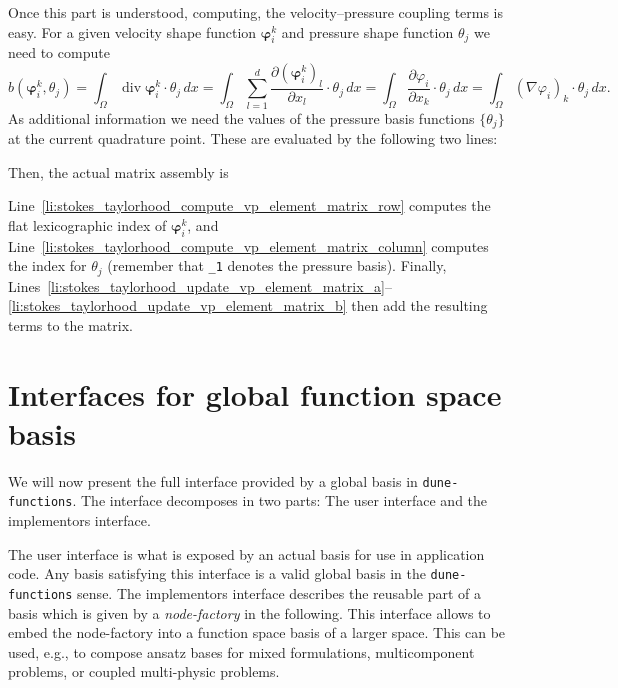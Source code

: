 \documentclass[a4paper,10pt,headings=normal,bibliography=totoc]{scrartcl}
\newcommand{\cpp}[1]{\lstinline[basicstyle=\ttfamily]!#1!}
\newcommand{\dunemodule}[1]{\texttt{#1}}
\begin{document}
Once this part is understood, computing, the velocity--pressure coupling terms is easy.
For a given velocity shape function $\bm{\varphi}_i^k$ and pressure shape function $\theta_j$ we need
to compute
\begin{equation*}
 b(\bm{\varphi}_i^k,\theta_j)
 =
 \int_\Omega \operatorname{div} \bm{\varphi}_i^k \cdot \theta_j\,dx
 =
 \int_\Omega \sum_{l=1}^d \frac{\partial (\bm{\varphi}_i^k)_l}{\partial x_l} \cdot \theta_j\,dx
 =
 \int_\Omega \frac{\partial \varphi_i}{\partial x_k} \cdot \theta_j\,dx
 =
 \int_\Omega (\nabla \varphi_i)_k \cdot \theta_j\,dx.
\end{equation*}
As additional information we need the values of the pressure basis functions $\{\theta_j\}$ at the
current quadrature point.  These are evaluated by the following two lines:
%

%
Then, the actual matrix assembly is
%

%
Line~\ref{li:stokes_taylorhood_compute_vp_element_matrix_row} computes the flat lexicographic index of $\bm{\varphi}_i^k$,
and Line~\ref{li:stokes_taylorhood_compute_vp_element_matrix_column} computes the index for $\theta_j$ (remember that \cpp{_1} denotes
the pressure basis).  Finally, Lines~\ref{li:stokes_taylorhood_update_vp_element_matrix_a}--\ref{li:stokes_taylorhood_update_vp_element_matrix_b}
then add the resulting terms to the matrix.



\section{Interfaces for global function space basis}

We will now present the full interface provided by a global basis in
\dunemodule{dune-functions}. The interface decomposes in two parts:
The user interface and the implementors interface.

The user interface is what is exposed by an actual basis for use in
application code. Any basis satisfying this interface is a valid
global basis in the \dunemodule{dune-functions} sense.
The implementors interface describes the reusable part of
a basis which is given by a \emph{node-factory} in the following.
This interface allows to embed the node-factory into a function space
basis of a larger space. This can be used, e.g., to compose
ansatz bases for mixed formulations, multicomponent problems,
or coupled multi-physic problems.
\end{document}
